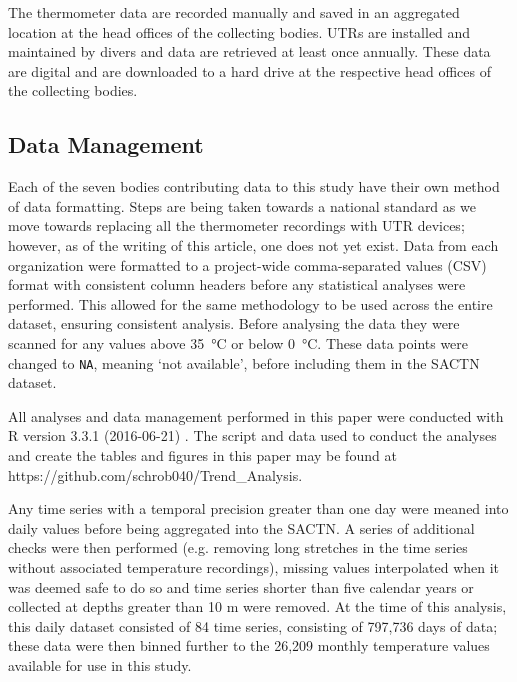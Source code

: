 \documentclass{ametsoc}
\begin{document}
The thermometer data are recorded manually and saved in an aggregated location at the head offices of the collecting bodies. UTRs are installed and maintained by divers and data are retrieved at least once annually. These data are digital and are downloaded to a hard drive at the respective head offices of the collecting bodies.

\subsection{Data Management}
Each of the seven bodies contributing data to this study have their own method of data formatting. Steps are being taken towards a national standard as we move towards replacing all the thermometer recordings with UTR devices; however, as of the writing of this article, one does not yet exist. Data from each organization were formatted to a project-wide comma-separated values (CSV) format with consistent column headers before any statistical analyses were performed. This allowed for the same methodology to be used across the entire dataset, ensuring consistent analysis. Before analysing the data they were scanned for any values above \SI{35}{\degreeCelsius} or below \SI{0}{\degreeCelsius}. These data points were changed to \texttt{NA}, meaning `not available', before including them in the SACTN dataset.

All analyses and data management performed in this paper were conducted with R version 3.3.1 (2016-06-21) \citep{R}. The script and data used to conduct the analyses and create the tables and figures in this paper may be found at https://github.com/schrob040/Trend_Analysis.

Any time series with a temporal precision greater than one day were meaned into daily values before being aggregated into the SACTN. A series of additional checks were then performed (e.g. removing long stretches in the time series without associated temperature recordings), missing values interpolated when it was deemed safe to do so and time series shorter than five calendar years or collected at depths greater than 10 m were removed. At the time of this analysis, this daily dataset consisted of 84 time series, consisting of 797,736 days of data; these data were then binned further to the 26,209 monthly temperature values available for use in this study.

\end{document}
